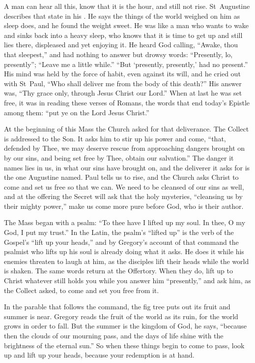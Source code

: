 A man can hear all this, know that it is the hour, and still not rise.
St~Augustine describes that state in his . He says the
things of the world weighed on him as sleep does, and he found the weight
sweet. He was like a man who wants to wake and sinks back into a heavy sleep,
who knows that it is time to get up and still lies there, displeased and yet
enjoying it. He heard God calling, ``Awake, thou that sleepest,'' and had
nothing to answer but drowsy words: ``Presently, lo, presently''; ``Leave me a
little while.'' ``But `presently, presently,' had no present.'' His mind was
held by the force of habit, even against its will, and he cried out with
St~Paul, ``Who shall deliver me from the body of this death?'' His answer was,
``Thy grace only, through Jesus Christ our Lord.'' When at last he was set
free, it was in reading these verses of Romans, the words that end today's
Epistle among them: ``put ye on the Lord Jesus Christ.''

At the beginning of this Mass the Church asked for that deliverance. The
Collect is addressed to the Son. It asks him to stir up his power and come,
``that, defended by Thee, we may deserve rescue from approaching dangers
brought on by our sins, and being set free by Thee, obtain our salvation.''
The danger it names lies in us, in what our sins have brought on, and the
deliverer it asks for is the one Augustine named. Paul tells us to rise, and
the Church asks Christ to come and set us free so that we can. We need to be
cleansed of our sins as well, and at the offering the Secret will ask that the
holy mysteries, ``cleansing us by their mighty power,'' make us come more pure
before God, who is their author.

The Mass began with a psalm: ``To thee have I lifted up my soul. In thee, O my
God, I put my trust.'' In the Latin, the psalm's ``lifted up'' is the verb of
the Gospel's ``lift up your heads,'' and by Gregory's account of that command
the psalmist who lifts up his soul is already doing what it asks. He does it
while his enemies threaten to laugh at him, as the disciples lift their heads
while the world is shaken. The same words return at the Offertory. When they
do, lift up to Christ whatever still holds you while you answer him
``presently,'' and ask him, as the Collect asked, to come and set you free
from it.

In the parable that follows the command, the fig tree puts out its fruit and
summer is near. Gregory reads the fruit of the world as its ruin, for the world
grows in order to fall. But the summer is the kingdom of God, he says,
``because then the clouds of our mourning pass, and the days of life shine
with the brightness of the eternal sun.'' So when these things begin to come
to pass, look up and lift up your heads, because your redemption is at hand.
